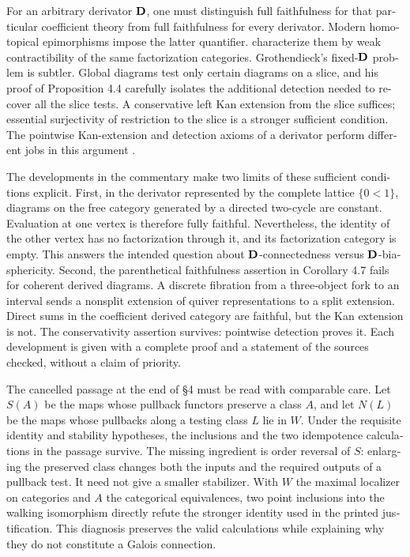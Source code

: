\begin{otherlanguage}{english}
For an arbitrary derivator $\mathbf{D}$, one must distinguish full faithfulness for
that particular coefficient theory from full faithfulness for every
derivator. Modern homotopical epimorphisms impose the latter quantifier.
\citet[Definition 6.1 and Theorem 6.10, arXiv v3]{GrothStovicek2016Trees}
characterize them by weak contractibility of the same factorization
categories. Grothendieck's fixed-$\mathbf{D}$ problem is subtler. Global diagrams
test only certain diagrams on a slice, and his proof of Proposition 4.4
carefully isolates the additional detection needed to recover all the slice
tests. A conservative left Kan extension from the slice suffices; essential
surjectivity of restriction to the slice is a stronger sufficient condition.
The pointwise Kan-extension and detection axioms of a derivator perform
different jobs in this argument \citep[Definition 1.5]{Groth2013}.

The developments in the commentary make two limits of these sufficient
conditions explicit. First, in the derivator represented by the complete
lattice $\{0<1\}$, diagrams on the free category generated by a directed
two-cycle are constant. Evaluation at one vertex is therefore fully
faithful. Nevertheless, the identity of the other vertex has no
factorization through it, and its factorization category is empty. This
answers the intended question about $\mathbf{D}$-connectedness versus
$\mathbf{D}$-biasphericity. Second, the parenthetical faithfulness assertion in
Corollary 4.7 fails for coherent derived diagrams. A discrete fibration from
a three-object fork to an interval sends a nonsplit extension of quiver
representations to a split extension. Direct sums in the coefficient
derived category are faithful, but the Kan extension is not. The
conservativity assertion survives: pointwise detection proves it. Each
development is given with a complete proof and a statement of the sources
checked, without a claim of priority.

The cancelled passage at the end of \S4 must be read with comparable care.
Let $S(A)$ be the maps whose pullback functors preserve a class $A$, and let
$N(L)$ be the maps whose pullbacks along a testing class $L$ lie in $W$.
Under the requisite identity and stability hypotheses, the inclusions and
the two idempotence calculations in the passage survive. The missing
ingredient is order reversal of $S$: enlarging the preserved class changes
both the inputs and the required outputs of a pullback test. It need not
give a smaller stabilizer. With $W$ the maximal localizer on categories and
$A$ the categorical equivalences, two point inclusions into the walking
isomorphism directly refute the stronger identity used in the printed
justification. This diagnosis preserves the valid calculations while
explaining why they do not constitute a Galois connection.


\end{otherlanguage}
